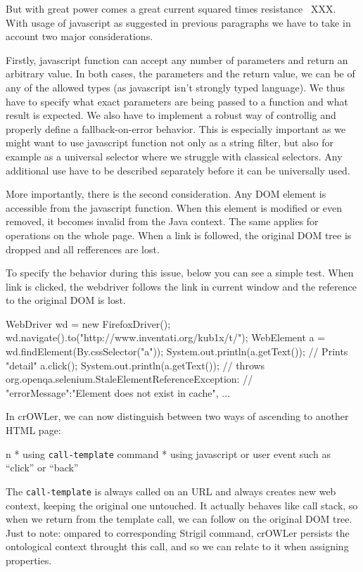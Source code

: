 But with great power comes a great current squared times
resistance~ XXX. With usage of javascript as
suggested in previous paragraphs we have to take in account two major
considerations. 

Firstly, javascript function can accept any number of parameters and return an
arbitrary value. In both cases, the parameters and the return value, we can be
of any of the allowed types (as javascript isn't strongly typed language). We
thus have to specify what exact parameters are being passed to a function and
what result is expected. We also have to implement a robust way of controllig
and properly define a fallback-on-error behavior. This is especially important
as we might want to use javascript function not only as a string filter, but also
for example as a universal selector where we struggle with classical selectors. 
Any additional use have to be described separately before it can be universally
used. 

More importantly, there is the second consideration. Any DOM element is
accessible from the javascript function. When this element is modified or even
removed, it becomes invalid from the Java context. The same applies for
operations on the whole page. When a link is followed, the original DOM tree 
is dropped and all refferences are lost. 

To specify the behavior during this issue, below you can see a simple test.
When link is clicked, the webdriver follows the link in current window and the
reference to the original DOM is lost. 

\begtt
WebDriver wd = new FirefoxDriver();
wd.navigate().to("http://www.inventati.org/kub1x/t/");
WebElement a = wd.findElement(By.cssSelector("a"));
System.out.println(a.getText()); // Prints "detail"
a.click();
System.out.println(a.getText());
// throws org.openqa.selenium.StaleElementReferenceException:
// { "errorMessage":"Element does not exist in cache", ... }
\endtt

In crOWLer, we can now distinguish between two ways of ascending to another HTML page: 

\begitems \style n
  * using {\tt call-template} command
  * using javascript or user event such as ``click'' or ``back''
\enditems

The {\tt call-template} is always called on an URL and always creates new web
context, keeping the original one untouched. It actually behaves like call
stack, so when we return from the template call, we can follow on the original
DOM tree. Just to note: ompared to corresponding Strigil command, crOWLer
persists the ontological context throught this call, and so we can relate to it
when assigning properties. 

